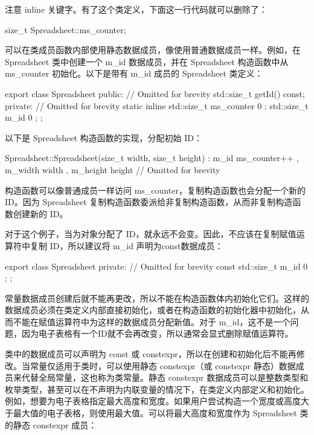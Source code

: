 注意 inline 关键字。有了这个类定义，下面这一行代码就可以删除了：

\begin{cpp}
size_t Spreadsheet::ms_counter;
\end{cpp}


可以在类成员函数内部使用静态数据成员，像使用普通数据成员一样。例如，在 Spreadsheet 类中创建一个 m\_id 数据成员，并在 Spreadsheet 构造函数中从 ms\_counter 初始化。以下是带有 m\_id 成员的 Spreadsheet 类定义：

\begin{cpp}
export class Spreadsheet
{
    public:
        // Omitted for brevity
        std::size_t getId() const;
    private:
        // Omitted for brevity
        static inline std::size_t ms_counter { 0 };
        std::size_t m_id { 0 };
};
\end{cpp}

以下是 Spreadsheet 构造函数的实现，分配初始 ID：

\begin{cpp}
Spreadsheet::Spreadsheet(size_t width, size_t height)
    : m_id { ms_counter++ }, m_width { width }, m_height { height }
{
    // Omitted for brevity
}
\end{cpp}

构造函数可以像普通成员一样访问 ms\_counter，复制构造函数也会分配一个新的 ID。因为 Spreadsheet 复制构造函数委派给非复制构造函数，从而非复制构造函数创建新的 ID。

对于这个例子，当为对象分配了 ID，就永远不会变。因此，不应该在复制赋值运算符中复制 ID，所以建议将 m\_id 声明为const数据成员：

\begin{cpp}
export class Spreadsheet
{
    private:
        // Omitted for brevity
        const std::size_t m_id { 0 };
};
\end{cpp}

常量数据成员创建后就不能再更改，所以不能在构造函数体内初始化它们。这样的数据成员必须在类定义内部直接初始化，或者在构造函数的初始化器中初始化，从而不能在赋值运算符中为这样的数据成员分配新值。对于 m\_id，这不是一个问题，因为电子表格有一个ID就不会再改变，所以通常会显式删除赋值运算符。


类中的数据成员可以声明为 const 或 constexpr，所以在创建和初始化后不能再修改。当常量仅适用于类时，可以使用静态 constexpr（或 constexpr 静态）数据成员来代替全局常量，这也称为类常量。静态 constexpr 数据成员可以是整数类型和枚举类型，甚至可以在不声明为内联变量的情况下，在类定义内部定义和初始化。例如，想要为电子表格指定最大高度和宽度。如果用户尝试构造一个宽度或高度大于最大值的电子表格，则使用最大值。可以将最大高度和宽度作为 Spreadsheet 类的静态 constexpr 成员：

